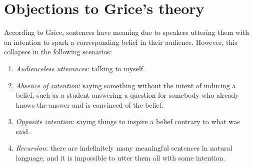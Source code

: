 \section{Objections to Grice's theory}

According to Grice, sentences have meaning due to speakers uttering them with an intention to spark a corresponding belief in their audience. However, this collapses in the following scenarios:
\begin{enumerate}[label=\roman*.]
  \item \emph{Audienceless utterances}: talking to myself.
  \item \emph{Absence of intention}: saying something without the intent of inducing a belief, such as a student answering a question for somebody who already knows the answer and is convinced of the belief.
  \item \emph{Opposite intention}: saying things to inspire a belief contrary to what was said.
  \item \emph{Recursion}: there are indefinitely many meaningful sentences in natural language, and it is impossible to utter them all with some intention.
\end{enumerate}
